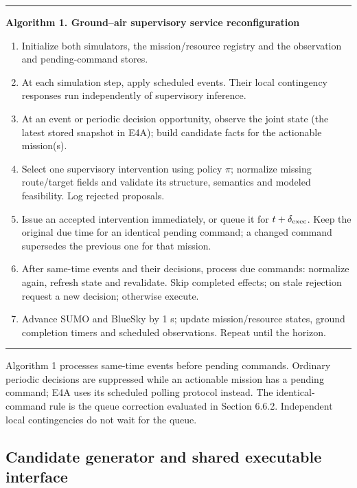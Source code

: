 \documentclass[]{interact}
\theoremstyle{plain}
\theoremstyle{definition}
\theoremstyle{remark}
\begin{document}
\begin{center}
\begin{minipage}{0.96\textwidth}
\hrule\vspace{5pt}
\textbf{Algorithm 1. Ground--air supervisory service reconfiguration}
\begin{enumerate}\setlength{\itemsep}{1pt}\setlength{\parskip}{0pt}
\item Initialize both simulators, the mission/resource registry and the observation and pending-command stores.
\item At each simulation step, apply scheduled events. Their local contingency responses run independently of supervisory inference.
\item At an event or periodic decision opportunity, observe the joint state (the latest stored snapshot in E4A); build candidate facts for the actionable mission(s).
\item Select one supervisory intervention using policy $\pi$; normalize missing route/target fields and validate its structure, semantics and modeled feasibility. Log rejected proposals.
\item Issue an accepted intervention immediately, or queue it for $t+\delta_{\rm exec}$. Keep the original due time for an identical pending command; a changed command supersedes the previous one for that mission.
\item After same-time events and their decisions, process due commands: normalize again, refresh state and revalidate. Skip completed effects; on stale rejection request a new decision; otherwise execute.
\item Advance SUMO and BlueSky by 1 s; update mission/resource states, ground completion timers and scheduled observations. Repeat until the horizon.
\end{enumerate}
\vspace{3pt}\hrule
\end{minipage}
\end{center}

Algorithm 1 processes same-time events before pending commands. Ordinary periodic decisions are suppressed while an actionable mission has a pending command; E4A uses its scheduled polling protocol instead. The identical-command rule is the queue correction evaluated in Section 6.6.2. Independent local contingencies do not wait for the queue.

\subsection{Candidate generator and shared executable interface}
\end{document}
